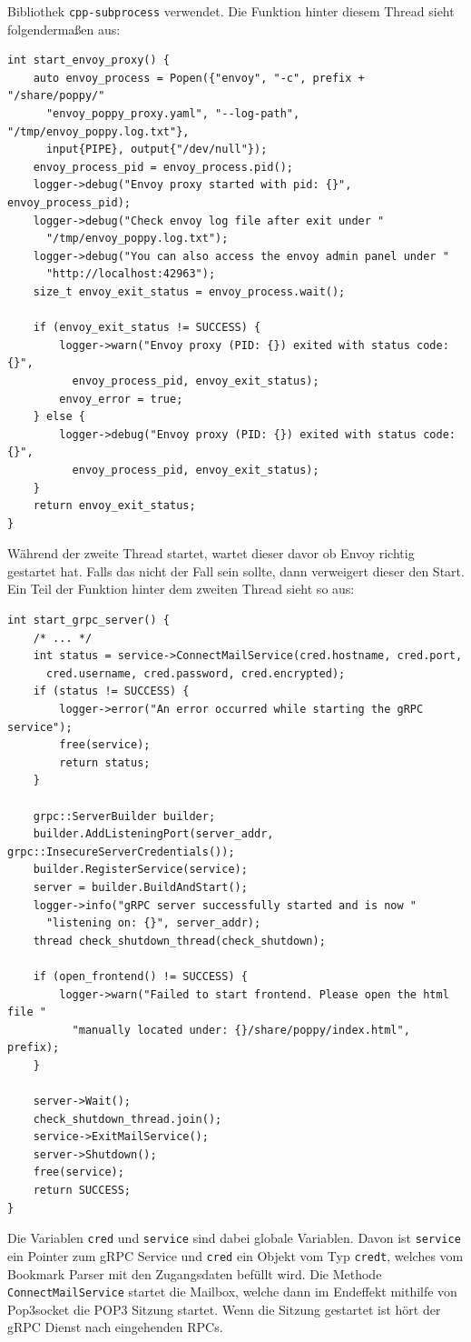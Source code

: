 \documentclass[12pt]{article}
\def\code#1{\texttt{#1}}
\begin{document}
Bibliothek \code{cpp-subprocess} verwendet. Die Funktion hinter diesem Thread 
sieht folgendermaßen aus:
\begin{verbatim}
int start_envoy_proxy() {
    auto envoy_process = Popen({"envoy", "-c", prefix + "/share/poppy/"
      "envoy_poppy_proxy.yaml", "--log-path", "/tmp/envoy_poppy.log.txt"}, 
      input{PIPE}, output{"/dev/null"});
    envoy_process_pid = envoy_process.pid();
    logger->debug("Envoy proxy started with pid: {}", envoy_process_pid);
    logger->debug("Check envoy log file after exit under "
      "/tmp/envoy_poppy.log.txt");
    logger->debug("You can also access the envoy admin panel under "
      "http://localhost:42963");
    size_t envoy_exit_status = envoy_process.wait();

    if (envoy_exit_status != SUCCESS) {
        logger->warn("Envoy proxy (PID: {}) exited with status code: {}",
          envoy_process_pid, envoy_exit_status);
        envoy_error = true;
    } else {
        logger->debug("Envoy proxy (PID: {}) exited with status code: {}",
          envoy_process_pid, envoy_exit_status);
    }
    return envoy_exit_status;
}
\end{verbatim}
Während der zweite Thread startet, wartet dieser davor ob Envoy richtig
gestartet hat. Falls das nicht der Fall sein sollte, dann verweigert dieser den
Start. Ein Teil der Funktion hinter dem zweiten Thread sieht so aus:
\begin{verbatim}
int start_grpc_server() {
    /* ... */
    int status = service->ConnectMailService(cred.hostname, cred.port, 
      cred.username, cred.password, cred.encrypted);
    if (status != SUCCESS) {
        logger->error("An error occurred while starting the gRPC service");
        free(service);
        return status;
    }
    
    grpc::ServerBuilder builder;
    builder.AddListeningPort(server_addr, grpc::InsecureServerCredentials());
    builder.RegisterService(service);
    server = builder.BuildAndStart();
    logger->info("gRPC server successfully started and is now "
      "listening on: {}", server_addr);
    thread check_shutdown_thread(check_shutdown);
    
    if (open_frontend() != SUCCESS) { 
        logger->warn("Failed to start frontend. Please open the html file "
          "manually located under: {}/share/poppy/index.html", prefix); 
    }

    server->Wait();
    check_shutdown_thread.join();
    service->ExitMailService();
    server->Shutdown();
    free(service);
    return SUCCESS;
}
\end{verbatim}
Die Variablen \code{cred} und \code{service} sind dabei globale Variablen.
Davon ist \code{service} ein Pointer zum gRPC Service und \code{cred} ein 
Objekt vom Typ \code{cred\textunderscore t}, welches vom Bookmark Parser mit 
den Zugangsdaten befüllt wird.
\newline
Die Methode \code{ConnectMailService} startet die Mailbox, welche dann im
Endeffekt mithilfe von Pop3socket die POP3 Sitzung startet. Wenn die Sitzung 
gestartet ist hört der gRPC Dienst nach eingehenden RPCs.
\end{document}
